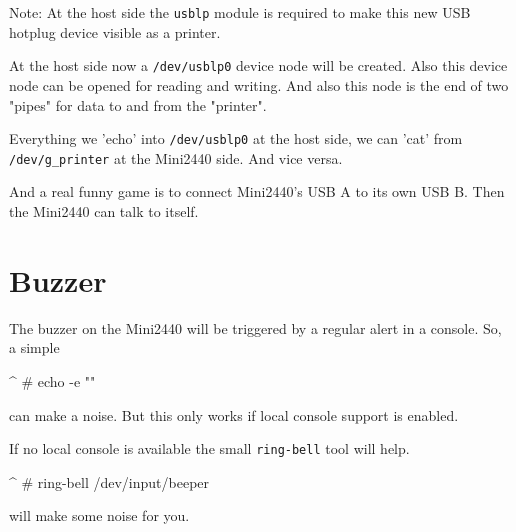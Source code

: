 Note: At the host side the \texttt{usblp} module is required to make this new
USB hotplug device visible as a printer.

At the host side now a \texttt{/dev/usblp0} device node will be created. Also
this device node can be opened for reading and writing. And also this node is
the end of two "pipes" for data to and from the "printer".

Everything we 'echo' into \texttt{/dev/usblp0} at the host side, we can 'cat'
from \texttt{/dev/g\_printer} at the Mini2440 side. And vice versa.

And a real funny game is to connect Mini2440's USB A to its own USB B. Then
the Mini2440 can talk to itself.


\section{Buzzer}					\label{sec:Buzzer}

The buzzer on the Mini2440 will be triggered by a regular alert in a console.
So, a simple

\begin{ptxshell}[escapechar=|]{^}
# echo -e "\a"
\end{ptxshell}

can make a noise. But this only works if local console support is enabled.

If no local console is available the small \texttt{ring-bell} tool will help.

\begin{ptxshell}[escapechar=|]{^}
# ring-bell /dev/input/beeper
\end{ptxshell}

will make some noise for you.

%
%
%


